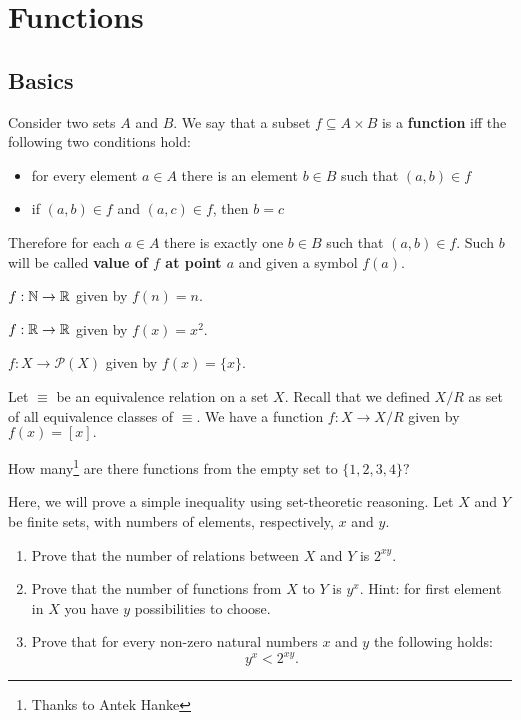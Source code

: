 \section{Functions}
\label{sec:intro_to_functions}

\subsection{Basics}
\noindent Consider two sets $A$ and $B$. We say that a subset $f\subseteq A\times B$ is a \textbf{function}
iff the following two conditions hold:
\begin{itemize}
	\item for every element $a\in A$ there is an element $b\in B$ such that $(a,b)\in f$
	\item if $(a,b)\in f$ and $(a,c)\in f$, then $b=c$
\end{itemize}
Therefore for each $a\in A$ there is exactly one $b\in B$ such that $(a,b)\in f$. Such $b$ will be called
\textbf{value of $f$ at point $a$} and given a symbol $f(a).$

\begin{example}
  $f: \mathbb N\to \mathbb R$ given by $f(n)=n$.
\end{example}

\begin{example}
  $f: \mathbb R\to \mathbb R$ given by $f(x)=x^2$.
\end{example}

\begin{example}
  $f: X\to \mathcal P(X)$ given by $f(x)=\{x\}$.
\end{example}

\begin{example}
  Let $\equiv$ be an equivalence relation on a set $X$. Recall that we
  defined $X/R$ as set of all equivalence classes of $\equiv$. We have a function
  $f: X\to X/R$ given by $f(x)=[x].$
\end{example}

\begin{prob}
	How many\footnote{Thanks to Antek Hanke} are there functions from the empty set to $\{1,2,3,4\}?$
\end{prob}

\begin{exercise}
  Here, we will prove a simple inequality using set-theoretic reasoning. Let $X$ and $Y$ be finite sets, with numbers of elements, respectively, $x$ and $y$.
  \begin{enumerate}
    \item Prove that the number of relations between $X$ and $Y$ is $2^{xy}$.
    \item Prove that the number of functions from $X$ to $Y$ is $y^x$. Hint: for first element in $X$ you have $y$ possibilities to choose.
    \item Prove that for every non-zero natural numbers $x$ and $y$ the following holds:
      $$y^x<2^{xy}.$$
  \end{enumerate}
\end{exercise}

